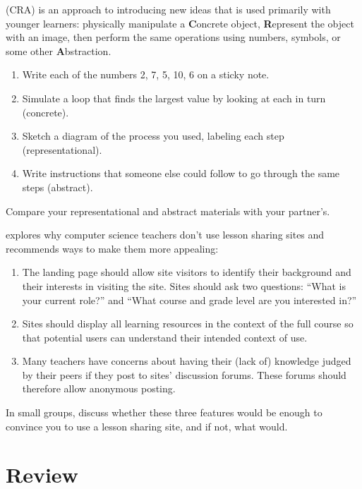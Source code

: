 
 (CRA)
is an approach to introducing new ideas
that is used primarily with younger learners:
physically manipulate a \textbf{C}oncrete object,
\textbf{R}epresent the object with an image,
then perform the same operations
using numbers, symbols, or some other \textbf{A}bstraction.

\begin{enumerate}

\item
  Write each of the numbers 2, 7, 5, 10, 6 on a sticky note.

\item
  Simulate a loop that finds the largest value by looking at each in turn (concrete).

\item
  Sketch a diagram of the process you used,
  labeling each step (representational).

\item
  Write instructions that someone else could follow
  to go through the same steps (abstract).
\end{enumerate}

Compare your representational and abstract materials with your partner's.


\cite{Leak2017} explores why computer science teachers don't use lesson sharing sites
and recommends ways to make them more appealing:

\begin{enumerate}

\item
  The landing page should allow site visitors to identify their background and their interests in visiting the site.
  Sites should ask two questions:
  ``What is your current role?'' and
  ``What course and grade level are you interested in?''

\item
   Sites should display all learning resources in the context of the full course
   so that potential users can understand their intended context of use.

\item
  Many teachers have concerns about having their (lack of) knowledge judged by their peers
  if they post to sites' discussion forums.
  These forums should therefore allow anonymous posting.

\end{enumerate}

In small groups,
discuss whether these three features would be enough to convince you to use a lesson sharing site,
and if not,
what would.

\section*{Review}

